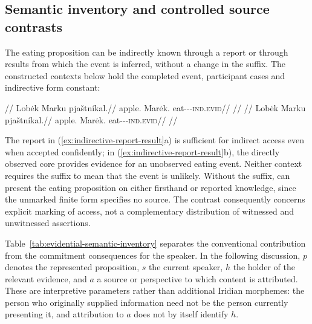 \subsection{Semantic inventory and controlled source contrasts}
\label{sec:evidential-semantic-inventory}

The eating proposition can be indirectly known through a report or through
results from which the event is inferred, without a change in the suffix.
The constructed contexts below hold the completed event, participant cases
and indirective form constant:

\pex\label{ex:indirective-report-result}%
\a
\begingl
\glpreamble {}//
\gla Lobėk Marku pjaštníkal.//
\glb apple.\Dir{} Marėk.\Trs{} eat-\Trs{}-\Pf{}-\textsc{ind.evid}//
\glft {}//
\endgl
\a
\begingl
\glpreamble {}//
\gla Lobėk Marku pjaštníkal.//
\glb apple.\Dir{} Marėk.\Trs{} eat-\Trs{}-\Pf{}-\textsc{ind.evid}//
\glft {}//
\endgl
\xe

The report in (\ref{ex:indirective-report-result}a) is sufficient for
indirect access even when accepted confidently; in
(\ref{ex:indirective-report-result}b), the directly observed core provides
evidence for an unobserved eating event. Neither context requires the
suffix to mean that the event is unlikely. Without the suffix,
 can present the eating proposition on either
firsthand or reported knowledge, since the unmarked finite form specifies
no source. The contrast consequently concerns explicit marking of access,
not a complementary distribution of witnessed and unwitnessed assertions.

Table~\ref{tab:evidential-semantic-inventory} separates the conventional
contribution from the commitment consequences for the speaker. In the
following discussion, $p$ denotes the represented proposition, $s$ the
current speaker, $h$ the holder of the relevant evidence, and $a$ a source
or perspective to which content is attributed. These are interpretive
parameters rather than additional Iridian morphemes: the person who
originally supplied information need not be the person currently
presenting it, and attribution to $a$ does not by itself identify $h$.

